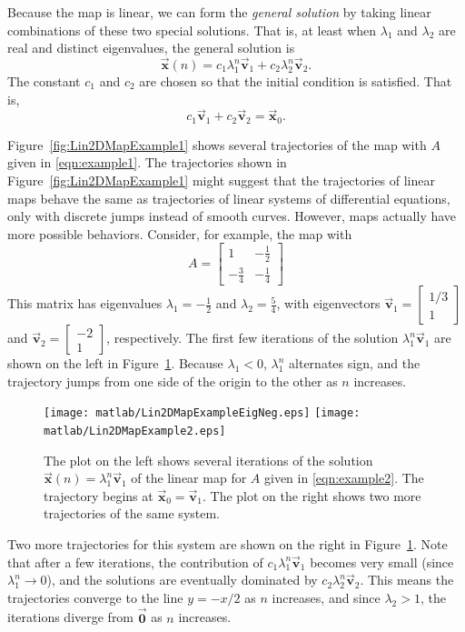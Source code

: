 \documentclass[reqno]{immbook}
\newcommand{\BV}{\vec{\textbf{v}}}
\newcommand{\BX}{\vec{\textbf{x}}}
\newcommand{\BZero}{\vec{\textbf{0}}}  %
\numberwithin{equation}{chapter}
\numberwithin{question}{section}
\numberwithin{theorem}{chapter}
\numberwithin{figure}{chapter}
\theoremstyle{definition}
\begin{document}
Because the map is linear, we can form the \emph{general solution}
by taking linear combinations of these two special solutions.
That is, at least when $\lambda_1$ and $\lambda_2$ are real and
distinct eigenvalues, the general solution is
\begin{equation}
   \BX(n) = c_1 \lambda_1^n \BV_1 + c_2 \lambda_2^n \BV_2.
\end{equation}
The constant $c_1$ and $c_2$ are chosen so that
the initial condition is satisfied. That is, 
\begin{equation}
   c_1 \BV_1 + c_2 \BV_2 = \BX_0.
\end{equation}


Figure~\ref{fig:Lin2DMapExample1} shows several trajectories
of the map with $A$ given in \eqref{eqn:example1}.
The trajectories shown in Figure~\ref{fig:Lin2DMapExample1}
might suggest that the trajectories of linear maps
behave the same as trajectories of
linear systems of  differential equations,
only with discrete jumps instead of smooth curves.
However, maps actually have more possible behaviors.
Consider, for example, the map with
\begin{equation}
  A = \begin{bmatrix} 1 & -\frac{1}{2} \\
                  -\frac{3}{4} & -\frac{1}{4}
      \end{bmatrix}
\label{eqn:example2}
\end{equation}
This matrix has eigenvalues $\lambda_1 = -\frac{1}{2}$ and
$\lambda_2 = \frac{5}{4}$, with eigenvectors
$\BV_1 = \begin{bmatrix} 1/3 \\ 1\end{bmatrix}$
and $\BV_2 = \begin{bmatrix} -2 \\ 1 \end{bmatrix}$, 
respectively.
The first few iterations of the solution $\lambda_1^n \BV_1$
are shown on the left in Figure~\ref{fig:Lin2DMapExample2}.
Because $\lambda_1 < 0$, $\lambda_1^n$ alternates sign, and the
trajectory jumps from one side of the origin to the other
as $n$ increases.
\begin{figure}
\centerline{%
\texttt{[image: matlab/Lin2DMapExampleEigNeg.eps]}
\texttt{[image: matlab/Lin2DMapExample2.eps]}
}
\caption{%
The plot on the left shows several iterations of the
solution $\BX(n) = \lambda_1^n\BV_1$ of the linear map
for $A$ given in \eqref{eqn:example2}.
The trajectory begins at
$\BX_0 = \BV_1$.
The plot on the right shows two more trajectories
of the same system.
}
\label{fig:Lin2DMapExample2}
\end{figure}
Two more trajectories for this system are shown on the right
in Figure~\ref{fig:Lin2DMapExample2}.
Note that after a few iterations,
the contribution of $c_1\lambda_1^n\BV_1$
becomes very small (since $\lambda_1^n\rightarrow 0$),
and the solutions are eventually dominated by 
$c_2\lambda_2^n\BV_2$.  This means the trajectories
converge to the line $y=-x/2$ as $n$ increases,
and since $\lambda_2 > 1$, the iterations diverge
from $\BZero$ as $n$ increases.
\end{document}
